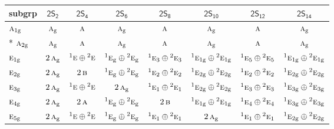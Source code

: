 \documentclass[10pt,a4paper]{article}
\numberwithin{equation}{section}
\newcommand{\grp}[1]{\mathsf{#1}}
\newcommand{\irr}[1]{\text{\normalfont\scshape #1}}
\newcommand{\conjpair}[1]{{}^{#1}}
\newcommand{\ptag}[1]{\mathrm{#1}}
\begin{document}
{\small\begin{longtable}{@{}lccccccc@{}}\toprule
subgrp & \href{2S2.pdf}{$\grp{2S_{2}}$} & \href{2S4.pdf}{$\grp{2S_{4}}$} & \href{2S6.pdf}{$\grp{2S_{6}}$} & \href{2S8.pdf}{$\grp{2S_{8}}$} & \href{2S10.pdf}{$\grp{2S_{10}}$} & \href{2S12.pdf}{$\grp{2S_{12}}$} & \href{2S14.pdf}{$\grp{2S_{14}}$}\\\midrule\endhead
\bottomrule\endfoot\endlastfoot
$\irr{a}_{1\ptag{g}}$ & $\irr{a}_{\ptag{g}}$ & $\irr{a}$ & $\irr{a}_{\ptag{g}}$ & $\irr{a}$ & $\irr{a}_{\ptag{g}}$ & $\irr{a}$ & $\irr{a}_{\ptag{g}}$\\*
$\irr{a}_{2\ptag{g}}$ & $\irr{a}_{\ptag{g}}$ & $\irr{a}$ & $\irr{a}_{\ptag{g}}$ & $\irr{a}$ & $\irr{a}_{\ptag{g}}$ & $\irr{a}$ & $\irr{a}_{\ptag{g}}$\\
$\irr{e}_{1\ptag{g}}$ & $2\,\irr{a}_{\ptag{g}}$ & $\conjpair{1}\irr{e}\oplus \conjpair{2}\irr{e}$ & $\conjpair{1}\irr{e}_{\ptag{g}}\oplus \conjpair{2}\irr{e}_{\ptag{g}}$ & $\conjpair{1}\irr{e}_{3}\oplus \conjpair{2}\irr{e}_{3}$ & $\conjpair{1}\irr{e}_{1\ptag{g}}\oplus \conjpair{2}\irr{e}_{1\ptag{g}}$ & $\conjpair{1}\irr{e}_{5}\oplus \conjpair{2}\irr{e}_{5}$ & $\conjpair{1}\irr{e}_{1\ptag{g}}\oplus \conjpair{2}\irr{e}_{1\ptag{g}}$\\
$\irr{e}_{2\ptag{g}}$ & $2\,\irr{a}_{\ptag{g}}$ & $2\,\irr{b}$ & $\conjpair{1}\irr{e}_{\ptag{g}}\oplus \conjpair{2}\irr{e}_{\ptag{g}}$ & $\conjpair{1}\irr{e}_{2}\oplus \conjpair{2}\irr{e}_{2}$ & $\conjpair{1}\irr{e}_{2\ptag{g}}\oplus \conjpair{2}\irr{e}_{2\ptag{g}}$ & $\conjpair{1}\irr{e}_{2}\oplus \conjpair{2}\irr{e}_{2}$ & $\conjpair{1}\irr{e}_{2\ptag{g}}\oplus \conjpair{2}\irr{e}_{2\ptag{g}}$\\
$\irr{e}_{3\ptag{g}}$ & $2\,\irr{a}_{\ptag{g}}$ & $\conjpair{1}\irr{e}\oplus \conjpair{2}\irr{e}$ & $2\,\irr{a}_{\ptag{g}}$ & $\conjpair{1}\irr{e}_{1}\oplus \conjpair{2}\irr{e}_{1}$ & $\conjpair{1}\irr{e}_{2\ptag{g}}\oplus \conjpair{2}\irr{e}_{2\ptag{g}}$ & $\conjpair{1}\irr{e}_{3}\oplus \conjpair{2}\irr{e}_{3}$ & $\conjpair{1}\irr{e}_{3\ptag{g}}\oplus \conjpair{2}\irr{e}_{3\ptag{g}}$\\
$\irr{e}_{4\ptag{g}}$ & $2\,\irr{a}_{\ptag{g}}$ & $2\,\irr{a}$ & $\conjpair{1}\irr{e}_{\ptag{g}}\oplus \conjpair{2}\irr{e}_{\ptag{g}}$ & $2\,\irr{b}$ & $\conjpair{1}\irr{e}_{1\ptag{g}}\oplus \conjpair{2}\irr{e}_{1\ptag{g}}$ & $\conjpair{1}\irr{e}_{4}\oplus \conjpair{2}\irr{e}_{4}$ & $\conjpair{1}\irr{e}_{3\ptag{g}}\oplus \conjpair{2}\irr{e}_{3\ptag{g}}$\\
$\irr{e}_{5\ptag{g}}$ & $2\,\irr{a}_{\ptag{g}}$ & $\conjpair{1}\irr{e}\oplus \conjpair{2}\irr{e}$ & $\conjpair{1}\irr{e}_{\ptag{g}}\oplus \conjpair{2}\irr{e}_{\ptag{g}}$ & $\conjpair{1}\irr{e}_{1}\oplus \conjpair{2}\irr{e}_{1}$ & $2\,\irr{a}_{\ptag{g}}$ & $\conjpair{1}\irr{e}_{1}\oplus \conjpair{2}\irr{e}_{1}$ & $\conjpair{1}\irr{e}_{2\ptag{g}}\oplus \conjpair{2}\irr{e}_{2\ptag{g}}$\\

\end{longtable}}
\end{document}
